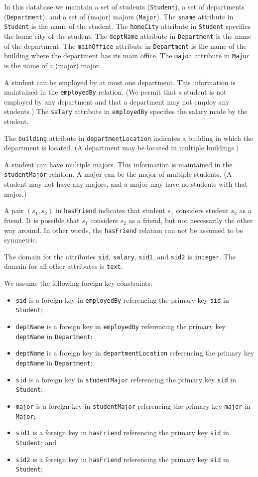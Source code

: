 \documentclass{article}
\begin{document}
In this database we maintain a set of students ({\tt Student}), a set
of departments ({\tt Department}), and a set of (major) majors ({\tt Major}).  
The {\tt sname} attribute in {\tt Student} is the name of the student.  
The {\tt homeCity} attribute in {\tt Student} specifies the home city of the student.
The {\tt deptName} attribute in {\tt Department} is the name of the department.
The {\tt mainOffice} attribute in {\tt Department} is the name of the building where the department has its main office.
The {\tt major} attribute in {\tt Major} is the name of a (major) major.

A student can be employed by at most one department. This information is maintained in the {\tt employedBy} relation. (We permit that a student is not employed by any department and that a department may not employ any students.)
The {\tt salary} attribute in {\tt employedBy} specifies the salary made by the student.

The {\tt building} attribute in {\tt departmentLocation} indicates a building in which the department is located.
(A department may be located in multiple buildings.)

A student can have multiple majors. This information is maintained in the {\tt studentMajor} relation.  A major can be
the major of multiple students.  (A student may not have any majors, and a major may
have no students with that major.)

A pair $(s_1,s_2)$ in {\tt hasFriend} indicates that student $s_1$ considers student $s_2$ as a friend.
It is possible that $s_1$ considers $s_2$ as a friend, but not necessarily the other way around.
In other words, the {\tt hasFriend} relation can not be assumed to be symmetric.

The domain for the attributes {\tt sid}, {\tt salary}, {\tt sid1}, and {\tt sid2} is {\tt integer}.   The domain for all other attributes is {\tt text}.

\medskip
We assume the following foreign key constraints:
\begin{itemize}
\item {\tt sid} is a foreign key in {\tt employedBy} referencing the primary key {\tt sid} in {\tt Student};
\item {\tt deptName} is a foreign key in {\tt employedBy} referencing the primary key {\tt deptName} in {\tt Department};
\item {\tt deptName} is a foreign key in {\tt departmentLocation} referencing the primary key {\tt deptName} in {\tt Department};
\item {\tt sid} is a foreign key in {\tt studentMajor} referencing the primary key {\tt sid} in {\tt Student};
\item {\tt major} is a foreign key in {\tt studentMajor} referencing the primary key {\tt major} in {\tt Major};
\item {\tt sid1} is a foreign key in {\tt hasFriend} referencing the primary key {\tt sid} in {\tt Student}; and
\item {\tt sid2} is a foreign key in {\tt hasFriend} referencing the primary key {\tt sid} in {\tt Student};

\end{itemize}
\end{document}
